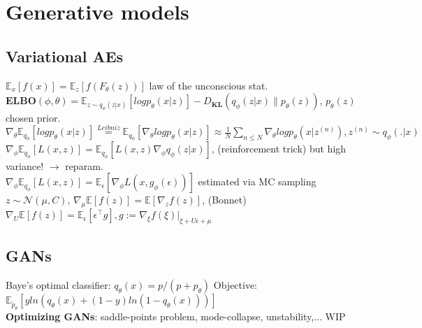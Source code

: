 \section{Generative models}
\subsection*{Variational AEs}
$\mathbb{E}_x[f(x)]=\mathbb{E}_z[f(F_\theta(z))]$ law of the unconscious stat. \\
$\textbf{ELBO}(\phi, \theta)=\mathbb{E}_{z\sim q_\phi(z\vert x)}[log p_\theta (x\vert z)] - D_{\textbf{KL}}(q_\phi (z \vert x) \| p_\theta (z))$, $p_\theta (z)$ chosen prior. \\
$\nabla_\theta \mathbb{E}_{q_\phi}[log p_\theta (x\vert z)] \stackrel{\textit{Leibniz}}{=}  \mathbb{E}_{q_\phi}[\nabla_\theta log p_\theta (x\vert z)] \approx \frac{1}{N}\sum_{n\leq N} \nabla_\theta log p_\theta (x\vert z^{(n)}), z^{(n)} \sim q_\phi(.\vert x)$ \\
$\nabla_\phi \mathbb{E}_{q_\phi}[L(x,z)] =  \mathbb{E}_{q_\phi}[L(x,z)\nabla_\phi q_\phi(z\vert x)]$, (reinforcement trick) but high variance! $\rightarrow$ reparam.\\
$\nabla_\phi \mathbb{E}_{q_\phi}[L(x,z)] =  \mathbb{E}_{\epsilon}[\nabla_\phi L(x, g_\phi(\epsilon))]$ estimated via MC sampling \\
$z\sim \mathcal{N}(\mu, C),\, \nabla_\mu \mathbb{E}[f(z)] = \mathbb{E}[\nabla_z f(z)]$, (Bonnet)\\
$\nabla_U \mathbb{E}[f(z)] = \mathbb{E}_\epsilon[\epsilon^\top g], g := \nabla_\xi f(\xi) \vert_{\xi + U\epsilon + \mu} $

\subsection*{GANs}
Baye's optimal classifier: $q_\theta(x) = p / (p + p_\theta)$ 
Objective: $\mathbb{E}_{\tilde p_\theta}[y ln(q_\theta(x) + (1-y)ln(1-q_\theta(x)))]$ \\
\textbf{Optimizing GANs}: saddle-points problem, mode-collapse, unstability,... WIP
